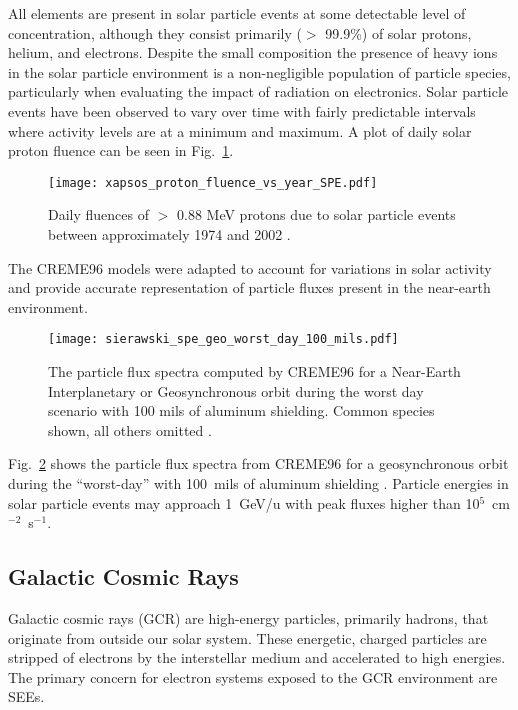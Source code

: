 All elements are present in solar particle events at some detectable level of concentration, although they consist primarily ($>$ 99.9\%) of solar protons, helium, and electrons.
Despite the small composition the presence of heavy ions in the solar particle environment is a non-negligible population of particle species, particularly when evaluating the impact of radiation on electronics.
Solar particle events have been observed to vary over time with fairly predictable intervals where activity levels are at a minimum and maximum.
A plot of daily solar proton fluence can be seen in Fig.~\ref{fig:proton_fluence_vs_year}.
\begin{figure}[htbp]
    \begin{center}
        \texttt{[image: xapsos\_proton\_fluence\_vs\_year\_SPE.pdf]}
    \end{center}
    \caption[Daily fluences of $>$ 0.88 MeV protons due to solar particle events between approximately 1974 and 2002.]{Daily fluences of $>$ 0.88 MeV protons due to solar particle events between approximately 1974 and 2002 \cite{xapsos:2006}.}
    \label{fig:proton_fluence_vs_year}
\end{figure}
The CREME96 models were adapted to account for variations in solar activity and provide accurate representation of particle fluxes present in the near-earth environment.
\begin{figure}[htbp]
    \begin{center}
        \texttt{[image: sierawski\_spe\_geo\_worst\_day\_100\_mils.pdf]}
    \end{center}
    \caption[The particle flux spectra computed by CREME96 for a Near-Earth Interplanetary or Geosynchronous orbit during the worst day scenario with 100 mils of aluminum shielding. Common species shown, all others omitted.]{The particle flux spectra computed by CREME96 for a Near-Earth Interplanetary or Geosynchronous orbit during the worst day scenario with 100 mils of aluminum shielding. Common species shown, all others omitted \cite{Sierawski:2011tc}.}
    \label{fig:spe-geo-worst-day-100-mils}
\end{figure}
Fig.~\ref{fig:spe-geo-worst-day-100-mils} shows the particle flux spectra from CREME96 for a geosynchronous orbit during the ``worst-day'' with 100~mils of aluminum shielding \cite{tylka1997creme96}.
Particle energies in solar particle events may approach 1~GeV/u with peak fluxes higher than 10$^5$~cm$^{-2}$~s$^{-1}$.

\subsection{Galactic Cosmic Rays} %
\label{sub:galactic_cosmic_rays}
Galactic cosmic rays (GCR) are high-energy particles, primarily hadrons, that originate from outside our solar system.
These energetic, charged particles are stripped of electrons by the interstellar medium and accelerated to high energies.
The primary concern for electron systems exposed to the GCR environment are SEEs.

